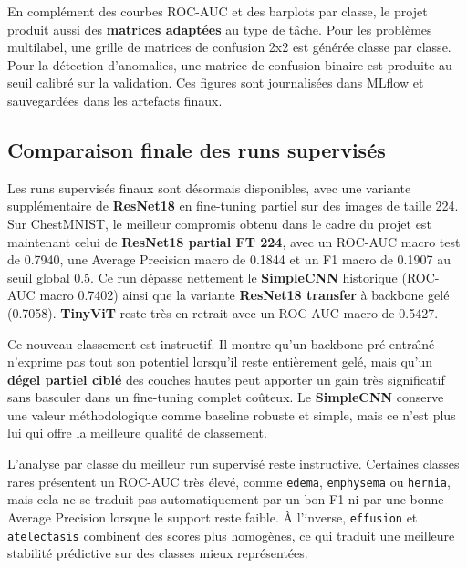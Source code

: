 \documentclass[11pt,a4paper]{article}
\begin{document}
En compl\'ement des courbes ROC-AUC et des barplots par classe, le projet produit aussi des \textbf{matrices adapt\'ees} au type de t\^ache. Pour les probl\`emes multilabel, une grille de matrices de confusion 2x2 est g\'en\'er\'ee classe par classe. Pour la d\'etection d'anomalies, une matrice de confusion binaire est produite au seuil calibr\'e sur la validation. Ces figures sont journalis\'ees dans MLflow et sauvegard\'ees dans les artefacts finaux.


\subsection{Comparaison finale des runs supervis\'es}
Les runs supervis\'es finaux sont d\'esormais disponibles, avec une variante suppl\'ementaire de \textbf{ResNet18} en fine-tuning partiel sur des images de taille 224. Sur ChestMNIST, le meilleur compromis obtenu dans le cadre du projet est maintenant celui de \textbf{ResNet18 partial FT 224}, avec un ROC-AUC macro test de 0.7940, une Average Precision macro de 0.1844 et un F1 macro de 0.1907 au seuil global 0.5. Ce run d\'epasse nettement le \textbf{SimpleCNN} historique (ROC-AUC macro 0.7402) ainsi que la variante \textbf{ResNet18 transfer} \`a backbone gel\'e (0.7058). \textbf{TinyViT} reste tr\`es en retrait avec un ROC-AUC macro de 0.5427.

Ce nouveau classement est instructif. Il montre qu'un backbone pr\'e-entra\^\i n\'e n'exprime pas tout son potentiel lorsqu'il reste enti\`erement gel\'e, mais qu'un \textbf{d\'egel partiel cibl\'e} des couches hautes peut apporter un gain tr\`es significatif sans basculer dans un fine-tuning complet co\^uteux. Le \textbf{SimpleCNN} conserve une valeur m\'ethodologique comme baseline robuste et simple, mais ce n'est plus lui qui offre la meilleure qualit\'e de classement.

L'analyse par classe du meilleur run supervis\'e reste instructive. Certaines classes rares pr\'esentent un ROC-AUC tr\`es \'elev\'e, comme \texttt{edema}, \texttt{emphysema} ou \texttt{hernia}, mais cela ne se traduit pas automatiquement par un bon F1 ni par une bonne Average Precision lorsque le support reste faible. \`A l'inverse, \texttt{effusion} et \texttt{atelectasis} combinent des scores plus homog\`enes, ce qui traduit une meilleure stabilit\'e pr\'edictive sur des classes mieux repr\'esent\'ees.
\end{document}
